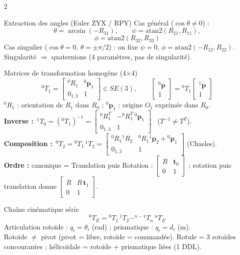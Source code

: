 \documentclass[10pt,a4paper]{article}
\newcommand{\vect}[1]{\mathbf{#1}}
\begin{document}
\begin{multicols}{2}
\begin{fbx}{Extraction des angles (Euler ZYX / RPY)}
Cas général ($\cos\theta\neq0$) :
\[\theta=\arcsin(-R_{31}),\qquad \psi=\mathrm{atan2}(R_{21},R_{11}),\]\[\phi=\mathrm{atan2}(R_{32},R_{33})\]
Cas singulier ($\cos\theta=0$, $\theta=\pm\pi/2$) : on fixe $\psi=0$, $\phi=\mathrm{atan2}(-R_{12},R_{22})$.\\
Singularité $\Rightarrow$ quaternions (4 paramètres, pas de singularité).
\end{fbx}

\begin{fbx}{Matrices de transformation homogène (4$\times$4)}
\[{}^0T_1=\begin{bmatrix}{}^0R_1&{}^0\vect p_1\\ 0_{1,3}&1\end{bmatrix}\in SE(3),\qquad
\begin{bmatrix}{}^0\vect p\\1\end{bmatrix}={}^0T_1\begin{bmatrix}{}^1\vect p\\1\end{bmatrix}\]
${}^0R_1$ : orientation de $R_1$ dans $R_0$ ; ${}^0\vect p_1$ : origine $O_1$ exprimée dans $R_0$.\\[2pt]
\textbf{Inverse :}\ ${}^1T_0=({}^0T_1)^{-1}=\begin{bmatrix}{}^0R_1^T&-{}^0R_1^T\,{}^0\vect p_1\\0_{1,3}&1\end{bmatrix}$ \ ($T^{-1}\neq T^T$).\\[2pt]
\textbf{Composition :}\ ${}^0T_2={}^0T_1\,{}^1T_2=\begin{bmatrix}{}^0R_1{}^1R_2&{}^0R_1{}^1\vect p_2+{}^0\vect p_1\\0_{1,3}&1\end{bmatrix}$ (Chasles).\\[2pt]
\textbf{Ordre :} canonique = Translation puis Rotation : $\begin{bmatrix}R&\vect t_0\\0&1\end{bmatrix}$ ; \og rotation puis translation\fg{} donne $\begin{bmatrix}R&R\,\vect t_1\\0&1\end{bmatrix}$.
\end{fbx}

\begin{fbx}{Chaîne cinématique série}
\[{}^0T_E={}^0T_1\,{}^1T_2\cdots{}^{n-1}T_n\,{}^nT_E\]
Articulation rotoïde : $q_i=\theta_i$ (rad) ; prismatique : $q_i=d_i$ (m).\\
Rotoïde $\neq$ pivot (pivot = libre, rotoïde = commandée). Rotule = 3 rotoïdes concourantes ; hélicoïdale = rotoïde + prismatique liées (1 DDL).
\end{fbx}


\end{multicols}
\end{document}
